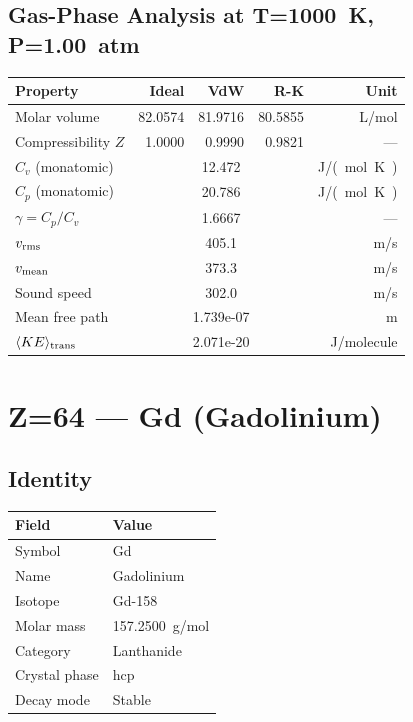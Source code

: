 \documentclass[11pt,a4paper]{article}
\begin{document}
\subsection{Gas-Phase Analysis at T=\SI{1000}{K}, P=\SI{1.00}{atm}}
\begin{tabular}{lrrrr}
  \toprule
  Property & Ideal & VdW & R-K & Unit \\
  \midrule
  Molar volume & 82.0574 & 81.9716 & 80.5855 & \si{L/mol} \\
  Compressibility $Z$ & 1.0000 & 0.9990 & 0.9821 & --- \\
  \midrule
  $C_v$ (monatomic) & \multicolumn{3}{c}{12.472} & \si{J/(mol.K)} \\
  $C_p$ (monatomic) & \multicolumn{3}{c}{20.786} & \si{J/(mol.K)} \\
  $\gamma = C_p/C_v$ & \multicolumn{3}{c}{1.6667} & --- \\
  $v_{\rm rms}$ & \multicolumn{3}{c}{405.1} & \si{m/s} \\
  $v_{\rm mean}$ & \multicolumn{3}{c}{373.3} & \si{m/s} \\
  Sound speed & \multicolumn{3}{c}{302.0} & \si{m/s} \\
  Mean free path & \multicolumn{3}{c}{1.739e-07} & \si{m} \\
  $\langle KE \rangle_{\rm trans}$ & \multicolumn{3}{c}{2.071e-20} & \si{J/molecule} \\
  \bottomrule
\end{tabular}

\newpage

\section{Z=64 --- Gd (Gadolinium)}
\label{sec:Z64}

\subsection{Identity}
\begin{tabular}{ll}
  \toprule
  Field & Value \\
  \midrule
  Symbol & Gd \\
  Name & Gadolinium \\
  Isotope & Gd-158 \\
  Molar mass & \SI{157.2500}{g/mol} \\
  Category & Lanthanide \\
  Crystal phase & hcp \\
  Decay mode & Stable \\
  \bottomrule
\end{tabular}
\end{document}
